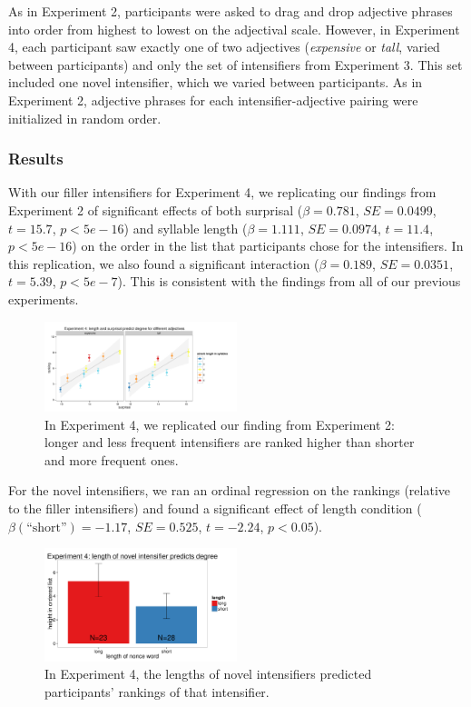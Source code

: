 \documentclass[10pt,letterpaper]{article}
\newcommand{\w}[1]{\emph{#1}}
\begin{document}
As in Experiment 2, participants were asked to drag and drop adjective phrases into order from highest to lowest on the adjectival scale. However, in Experiment 4, each participant saw exactly one of two adjectives (\w{expensive} or \w{tall}, varied between participants) and only the set of intensifiers from Experiment 3. This set included one novel intensifier, which we varied between participants. As in Experiment 2, adjective phrases for each intensifier-adjective pairing were initialized in random order.

\subsubsection{Results}
With our filler intensifiers for Experiment 4, we replicating our findings from Experiment 2 of significant effects of both surprisal ($\beta=0.781$, $SE=0.0499$, $t=15.7$, $p<5e-16$)
and syllable length ($\beta=1.111$, $SE=0.0974$, $t=11.4$, $p<5e-16$) on the order in the list that participants chose for the intensifiers.
In this replication, we also found a significant
interaction ($\beta=0.189$, $SE=0.0351$, $t=5.39$, $p<5e-7$). This is consistent with the findings from all of our previous experiments.

\begin{figure}[hbt]
\begin{center}
\includegraphics[width=0.5\textwidth]{exp4_replication.pdf}
\end{center}
\caption{In Experiment 4, we replicated our finding from Experiment 2: longer and less frequent intensifiers are ranked higher than shorter and more frequent ones.} 
\label{exp4_replication}
\end{figure}

For the novel intensifiers, we ran an ordinal regression on the rankings (relative to the filler intensifiers) and found a significant effect of length condition ($\beta(\mbox{``short''})=-1.17$, $SE=0.525$, $t=-2.24$, $p<0.05$).

\begin{figure}[hbt]
\begin{center}
\includegraphics[width=0.5\textwidth]{exp4.pdf}
\end{center}
\caption{In Experiment 4, the lengths of novel intensifiers predicted participants' rankings of that intensifier.}
\label{exp4_novel}
\end{figure}
\end{document}
